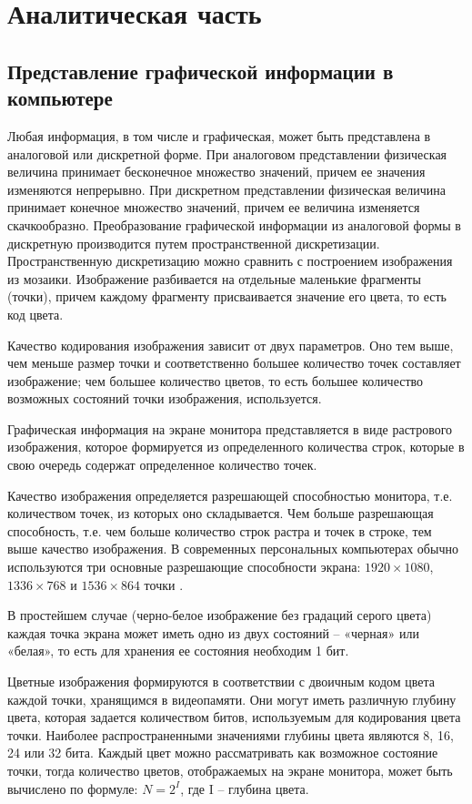\section{Аналитическая часть}

\subsection{Представление графической информации в компьютере}

Любая информация, в том числе и графическая, может быть представлена в аналоговой или дискретной форме. При аналоговом представлении физическая величина принимает бесконечное множество значений, причем ее значения изменяются непрерывно. При дискретном представлении физическая величина принимает конечное множество значений, причем ее величина изменяется скачкообразно. Преобразование графической информации из аналоговой формы в дискретную производится путем пространственной дискретизации. Пространственную дискретизацию можно сравнить с построением изображения из мозаики. Изображение разбивается на отдельные маленькие фрагменты (точки), причем каждому фрагменту присваивается значение его цвета, то есть код цвета.

Качество кодирования изображения зависит от двух параметров. Оно тем выше, чем меньше размер точки и соответственно большее количество точек составляет изображение; чем большее количество цветов, то есть большее количество возможных состояний точки изображения, используется.

Графическая информация на экране монитора представляется в виде растрового изображения, которое формируется из определенного количества строк, которые в свою очередь содержат определенное количество точек.

Качество изображения определяется разрешающей способностью монитора, т.е. количеством точек, из которых оно складывается. Чем больше разрешающая способность, т.е. чем больше количество строк растра и точек в строке, тем выше качество изображения. В современных персональных компьютерах обычно используются три основные разрешающие способности экрана: $1920\times1080$, $1336\times768$ и $1536\times864$ точки \cite{screen}.

В простейшем случае (черно-белое изображение без градаций серого цвета) каждая точка экрана может иметь одно из двух состояний -- «черная» или «белая», то есть для хранения ее состояния необходим 1 бит.

Цветные изображения формируются в соответствии с двоичным кодом цвета каждой точки, хранящимся в видеопамяти. Они могут иметь различную глубину цвета, которая задается количеством битов, используемым для кодирования цвета точки. Наиболее распространенными значениями глубины цвета являются 8, 16, 24 или 32 бита. Каждый цвет можно рассматривать как возможное состояние точки, тогда количество цветов, отображаемых на экране монитора, может быть вычислено по формуле:  $N = 2^I$, где I -- глубина цвета.

